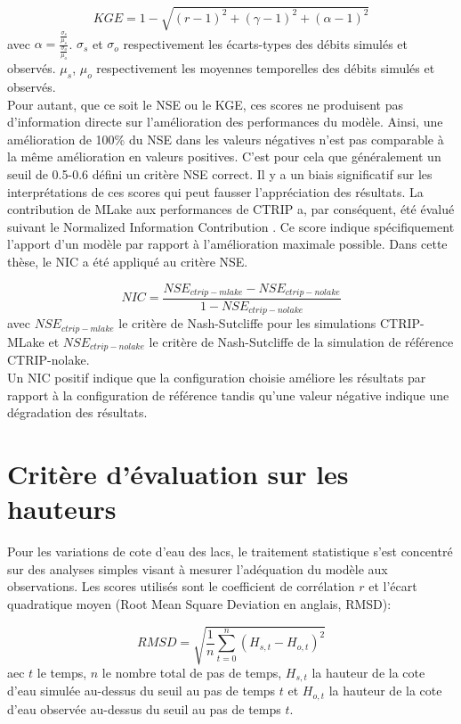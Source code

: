 \begin{equation}
KGE = 1-\sqrt{(r-1)^{2}+(\gamma-1)^{2}+(\alpha-1)^{2}}
\end{equation}
avec $\alpha = \frac{\frac{\sigma_{s}}{\mu_{s}}}{ \frac{\sigma_{o}}{\mu_{o}}}$. $\sigma_{s}$ et $\sigma_{o}$ respectivement les écarts-types des débits simulés et observés. $\mu_{s}$, $\mu_{o}$ respectivement les moyennes temporelles des débits simulés et observés. \\

Pour autant, que ce soit le NSE ou le KGE, ces scores ne produisent pas d'information directe sur l'amélioration des performances du modèle. Ainsi, une amélioration de 100\% du NSE dans les valeurs négatives n'est pas comparable à la même amélioration en valeurs positives. C'est pour cela que généralement un seuil de 0.5-0.6 défini un critère NSE correct. Il y a un biais significatif sur les interprétations de ces scores qui peut fausser l'appréciation des résultats. La contribution de MLake aux performances de CTRIP a, par conséquent, été évalué suivant le Normalized Information Contribution \citep[NIC,][]{kumar2009}. Ce score indique spécifiquement l'apport d'un modèle par rapport à l'amélioration maximale possible. Dans cette thèse, le NIC a été appliqué au critère NSE.

\begin{equation}
NIC = \frac{NSE_{ctrip-mlake}-NSE_{ctrip-nolake}}{1-NSE_{ctrip-nolake}}
\end{equation}
avec $NSE_{ctrip-mlake}$ le critère de Nash-Sutcliffe pour les simulations CTRIP-MLake et $NSE_{ctrip-nolake}$ le critère de Nash-Sutcliffe de la simulation de référence CTRIP-nolake.\\

Un NIC positif indique que la configuration choisie améliore les résultats par rapport à la configuration de référence tandis qu'une valeur négative indique une dégradation des résultats.

\section{{\selectfont Critère d'évaluation sur les hauteurs}}

Pour les variations de cote d'eau des lacs, le traitement statistique s'est concentré sur des analyses simples visant à mesurer l'adéquation du modèle aux observations. Les scores utilisés sont le coefficient de corrélation $r$ et l'écart quadratique moyen (Root Mean Square Deviation en anglais, RMSD):

\begin{equation}
RMSD=\sqrt{\frac{1}{n}\sum\limits_{t=0}^n(H_{s,t}-H_{o,t})^{2}}
\end{equation}
aec $t$ le temps, $n$ le nombre total de pas de temps, $H_{s,t}$ la hauteur de la cote d'eau simulée au-dessus du seuil au pas de temps $t$ et $H_{o,t}$ la hauteur de la cote d'eau observée au-dessus du seuil au pas de temps $t$.
